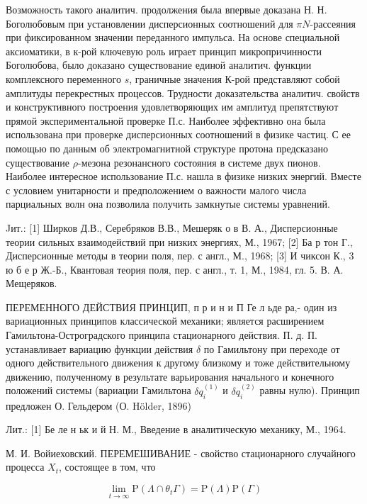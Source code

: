\documentclass[10pt]{article}
\begin{document}
Возможность такого аналитич. продолжения была впервые доказана Н. Н. Боголюбовым при установлении дисперсионных соотношений для $\pi N$-рассеяния при фиксированном значении переданного импульса. На основе специальной аксиоматики, в к-рой ключевую роль играет принцип микропричинности Боголюбова, было доказано существование единой аналитич. функции комплексного переменного $s$, граничные значения К-рой представляют собой амплитуды перекрестных процессов. Трудности доказательства аналитич. свойств и конструктивного построения удовлетворяющих им амплитуд препятствуют прямой экспериментальной проверке П.с. Наиболее эффективно она была использована при проверке дисперсионных соотношений в физике частиц. С ее помощью по данным об электромагнитной структуре протона предсказано существование $\rho$-мезона резонансного состояния в системе двух пионов. Наиболее интересное использование П.с. нашла в физике низких энергий. Вместе с условием унитарности и предположением о важности малого числа парциальных волн она позволила получить замкнутые системы уравнений.



Jит.: [1] Ширков Д.В., Серебряков В.В., Мешеряк о в В. А., Дисперсионные теории сильных взаимодействий при низких энергиях, М., 1967; [2] Ба р тон Г., Дисперсионные методы в теории поля, пер. с англ., М., 1968; [3] И чиксон К., 3 ю б е р Ж.-Б., Квантовая теория поля, пер. с англ., т. 1, М., 1984, гл. 5. В. А. Мещеряков.



ПЕРЕМЕННОГО ДЕЙСТВИЯ ПРИНЦИП, п р и н и П Ге л ьде ра,- один из вариационных принципов классической механики; является расширением Гамильтона-Остроградского принципа стационарного действия. П. д. П. устанавливает вариацию функции действия $\delta$ по Гамильтону при переходе от одного действительного движения к другому близкому и тоже действительному движению, полученному в результате варьирования начального и конечного положений системы (вариации Гамильтона $\delta q_{i}^{(1)}$ и $\delta q_{i}^{(2)}$ равны нулю). Принцип предложен О. Гельдером (О. Hölder, 1896)



Лит.: [1] Бе ле н ьк и й Н. М., Введение в аналитическую механику, М., 1964.



М. И. Войиеховский. ПЕРЕМЕШИВАНИЕ - свойство стационарного случайного процесса $X_{t}$, состоящее в том, что



\[

\lim _{t \rightarrow \infty} \mathrm{P}\left(\Lambda \cap \theta_{t} \Gamma\right)=\mathrm{P}(\Lambda) \mathrm{P}(\Gamma)

\]
\end{document}
